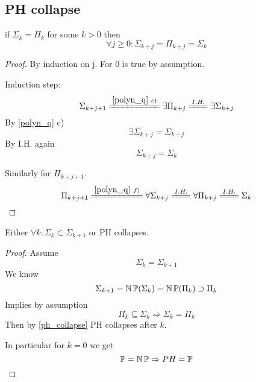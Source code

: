 


\subsection{PH collapse}

\begin{consequence}\label{ph_collapse}
	if $\Sigma_k = \Pi_k$ for some $k > 0$ then
	\[ \forall j \geq 0: \Sigma_{k + j} = \Pi_{k + j} = \Sigma_k \]
\end{consequence}
\begin{proof}
	By induction on j. For 0 is true by assumption.

	Induction step:
	\[ \Sigma_{k + j + 1} \xlongequal{\cref{polyn_q}\ c)} \exists \Pi_{k + j} \xlongequal{I.H.} \exists \Sigma_{k + j} \]
	By \cref{polyn_q} c)
	\[ \exists \Sigma_{k + j} = \Sigma_{k + j} \]
	By I.H. again
	\[ \Sigma_{k + j} = \Sigma_k \]

	Similarly for $\Pi_{k + j + 1}$.
	\[ \Pi_{k + j + 1} \xlongequal{\cref{polyn_q}\ f)} \forall \Sigma_{k + j} \xlongequal{I.H.} \forall \Pi_{k + j} \xlongequal{I.H.} \Sigma_k \]
\end{proof}

\begin{consequence}
	Either $\forall k: \Sigma_k \subset \Sigma_{k + 1}$ or PH collapses.
\end{consequence}
\begin{proof}
	Assume
	\[ \Sigma_k = \Sigma_{k + 1} \]
	We know
	\[ \Sigma_{k + 1} = \operatorname{\operatorname{\mathbb{N}}\mathbb{P}}(\Sigma_{k}) = \operatorname{\operatorname{\mathbb{N}}\mathbb{P}}(\Pi_k) \supset \Pi_k \]
	Implies by assumption
	\[ \Pi_k \subseteq \Sigma_k \Rightarrow \Sigma_k = \Pi_k \]
	Then by \cref{ph_collapse} PH collapses after $k$.

	In particular for $k = 0$ we get
	\[ \operatorname{\mathbb{P}} = \operatorname{\operatorname{\mathbb{N}}\mathbb{P}} \Rightarrow PH = \operatorname{\mathbb{P}} \]
\end{proof}

